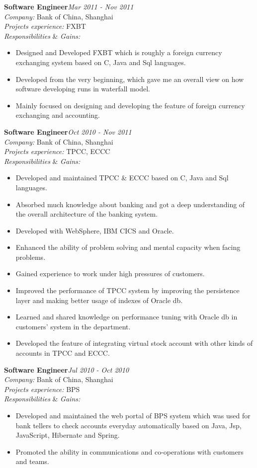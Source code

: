 \documentclass[line, margin, 11pt]{res}
\begin{document}
\begin{resume}
{\bf Software Engineer}\hfill {\it Mar 2011 - Nov 2011}\\
{\sl Company:} Bank of China, Shanghai\\
{\sl Projects experience:} FXBT\\
{\sl Responsibilities} \& {\sl Gains:}
\begin{itemize}
\item Designed and Developed FXBT which is roughly a foreign currency exchanging system based on C, Java and Sql languages.
\item Developed from the very beginning, which gave me an overall view on how software developing runs in waterfall model.
\item Mainly focused on designing and developing the feature of foreign currency exchanging and accounting.
\end{itemize}

{\bf Software Engineer}\hfill {\it Oct 2010 - Nov 2011}\\
{\sl Company:} Bank of China, Shanghai\\
{\sl Projects experience:} TPCC, ECCC\\
{\sl Responsibilities} \& {\sl Gains:}
\begin{itemize}
\item Developed and maintained TPCC \& ECCC based on C, Java and Sql languages.
\item Absorbed much knowledge about banking and got a deep understanding of the overall architecture of the banking system.
\item Developed with WebSphere, IBM CICS and Oracle.
\item Enhanced the ability of problem solving and mental capacity when facing problems.
\item Gained experience to work under high pressures of customers.
\item Improved the performance of TPCC system by improving the persistence layer and making better usage of indexes of Oracle db.
\item Learned and shared knowledge on performance tuning with Oracle db in customers' system in the department.
\item Developed the feature of integrating virtual stock account with other kinds of accounts in TPCC and ECCC.
\end{itemize}

{\bf Software Engineer}\hfill {\it Jul 2010 - Oct 2010}\\
{\sl Company:} Bank of China, Shanghai\\
{\sl Projects experience:} BPS\\
{\sl Responsibilities} \& {\sl Gains:}
\begin{itemize}
\item Developed and maintained the web portal of BPS system which was used for bank tellers to check accounts everyday automatically based on Java, Jsp, JavaScript, Hibernate and Spring.
\item Promoted the ability in communications and co-operations with customers and teams.
\end{itemize}


\end{resume}
\end{document}
